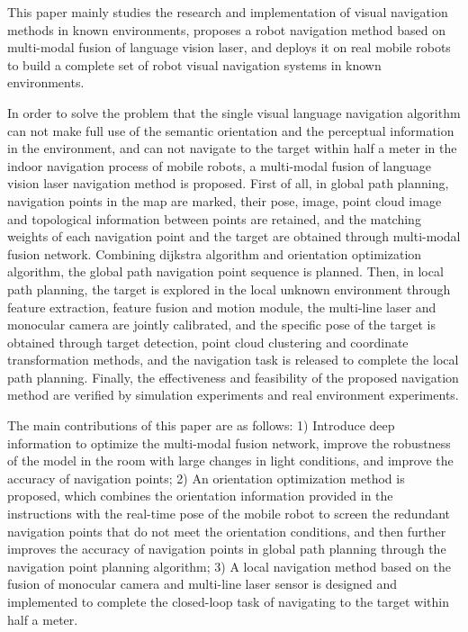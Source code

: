     This paper mainly studies the research and implementation of visual navigation methods in known environments, proposes a robot navigation method based on multi-modal fusion of language vision laser, and deploys it on real mobile robots to build a complete set of robot visual navigation systems in known environments.

    In order to solve the problem that the single visual language navigation algorithm can not make full use of the semantic orientation and the perceptual information in the environment, and can not navigate to the target within half a meter in the indoor navigation process of mobile robots, a multi-modal fusion of language vision laser navigation method is proposed. First of all, in global path planning, navigation points in the map are marked, their pose, image, point cloud image and topological information between points are retained, and the matching weights of each navigation point and the target are obtained through multi-modal fusion network. Combining dijkstra algorithm and orientation optimization algorithm, the global path navigation point sequence is planned. Then, in local path planning, the target is explored in the local unknown environment through feature extraction, feature fusion and motion module, the multi-line laser and monocular camera are jointly calibrated, and the specific pose of the target is obtained through target detection, point cloud clustering and coordinate transformation methods, and the navigation task is released to complete the local path planning. Finally, the effectiveness and feasibility of the proposed navigation method are verified by simulation experiments and real environment experiments.

    The main contributions of this paper are as follows: 1) Introduce deep information to optimize the multi-modal fusion network, improve the robustness of the model in the room with large changes in light conditions, and improve the accuracy of navigation points; 2) An orientation optimization method is proposed, which combines the orientation information provided in the instructions with the real-time pose of the mobile robot to screen the redundant navigation points that do not meet the orientation conditions, and then further improves the accuracy of navigation points in global path planning through the navigation point planning algorithm; 3) A local navigation method based on the fusion of monocular camera and multi-line laser sensor is designed and implemented to complete the closed-loop task of navigating to the target within half a meter.

